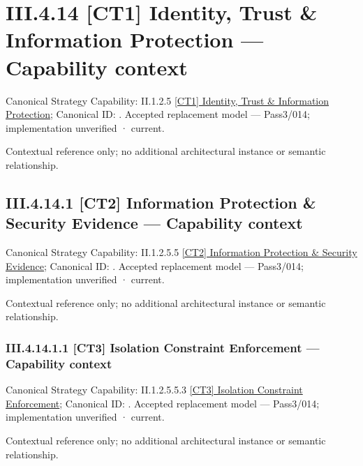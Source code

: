 \section*{III.4.14 [CT1] Identity, Trust \& Information Protection — Capability context}
\label{navigation:III.4.14}

{\small Canonical Strategy Capability: II.1.2.5 \hyperref[element:def358c06649413ba4773582e0d5c6d4]{[CT1] Identity, Trust \& Information Protection}; Canonical ID: \texttt{}. Accepted replacement model — Pass3/014; implementation unverified · current.}\par
Contextual reference only; no additional architectural instance or semantic relationship.\par
\subsection*{III.4.14.1 [CT2] Information Protection \& Security Evidence — Capability context}
\label{navigation:III.4.14.1}

{\small Canonical Strategy Capability: II.1.2.5.5 \hyperref[element:ece1a982b80e46e0a868b4865dfcdfc3]{[CT2] Information Protection \& Security Evidence}; Canonical ID: \texttt{}. Accepted replacement model — Pass3/014; implementation unverified · current.}\par
Contextual reference only; no additional architectural instance or semantic relationship.\par
\subsubsection*{III.4.14.1.1 [CT3] Isolation Constraint Enforcement — Capability context}
\label{navigation:III.4.14.1.1}

{\small Canonical Strategy Capability: II.1.2.5.5.3 \hyperref[element:2475396dd27745fe80df6c887c064f8a]{[CT3] Isolation Constraint Enforcement}; Canonical ID: \texttt{}. Accepted replacement model — Pass3/014; implementation unverified · current.}\par
Contextual reference only; no additional architectural instance or semantic relationship.\par
